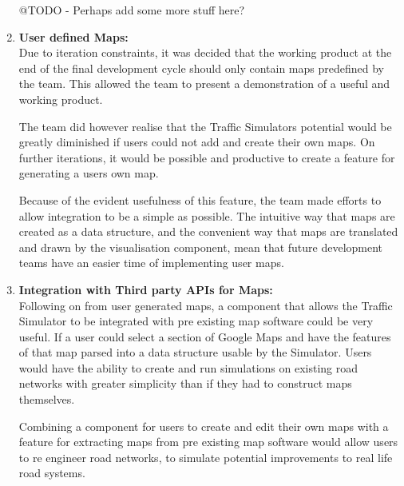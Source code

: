 \documentclass[11pt]{article}
\begin{document}
\begin{enumerate}
	@TODO - Perhaps add some more stuff here?\\
	
	\item \textbf{User defined Maps:} 
	\\
	
	Due to iteration constraints, it was decided that the working product at the end of the final development cycle should only contain maps predefined by the team. This allowed the team to present a demonstration of a useful and working product.
	
	The team did however realise that the Traffic Simulators potential would be greatly diminished if users could not add and create their own maps. On further iterations, it would be possible and productive to create a feature for generating a users own map.
	
	Because of the evident usefulness of this feature, the team made efforts to allow integration to be a simple as possible. The intuitive way that maps are created as a data structure, and the convenient way that maps are translated and drawn by the visualisation component, mean that future development teams have an easier time of implementing user maps.\\
	
	
	\item \textbf{Integration with Third party APIs for Maps:} 
	\\
	
	Following on from user generated maps, a component that allows the Traffic Simulator to be integrated with pre existing map software could be very useful. If a user could select a section of Google Maps and have the features of that map parsed into a data structure usable by the Simulator. Users would have the ability to create and run simulations on existing road networks with greater simplicity than if they had to construct maps themselves.
	
	Combining a component for users to create and edit their own maps with a feature for extracting maps from pre existing map software would allow users to re engineer road networks, to simulate potential improvements to real life road systems.
	
\end{enumerate}

	
\end{document}
